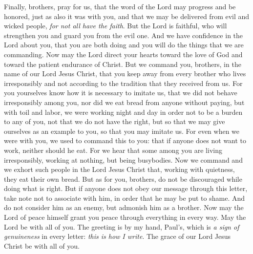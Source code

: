 \begin{biblechapter} %
 Finally, brothers, pray for us, that the word of the Lord may progress and be honored, just as also it was with you,
\verse and that we may be delivered from evil and wicked people, \textit{for not all have the faith}.
\verse But the Lord is faithful, who will strengthen you and guard you from the evil one.
\verse And we have confidence in the Lord about you, that you are both doing and you will do the things that we are commanding.
\verse Now may the Lord direct your hearts toward the love of God and toward the patient endurance of Christ.
 But we command you, brothers, in the name of our Lord Jesus Christ, that you keep away from every brother who lives irresponsibly and not according to the tradition that they received from us.
\verse For you yourselves know how it is necessary to imitate us, that we did not behave irresponsibly among you,
\verse nor did we eat bread from anyone without paying, but with toil and labor, we were working night and day in order not to be a burden to any of you,
\verse not that we do not have the right, but so that we may give ourselves as an example to you, so that you may imitate us.
\verse For even when we were with you, we used to command this to you: that if anyone does not want to work, neither should he eat.
\verse For we hear that some among you are living irresponsibly, working at nothing, but being busybodies.
\verse Now we command and we exhort such people in the Lord Jesus Christ that, working with quietness, they eat their own bread.
\verse But as for you, brothers, do not be discouraged while doing what is right.
\verse But if anyone does not obey our message through this letter, take note not to associate with him, in order that he may be put to shame.
\verse And do not consider him as an enemy, but admonish him as a brother.
 Now may the Lord of peace himself grant you peace through everything in every way. May the Lord be with all of you.
\verse The greeting is by my hand, Paul’s, which is \textit{a sign of genuineness} in every letter: \textit{this is how I write}.
\verse The grace of our Lord Jesus Christ be with all of you.
\end{biblechapter}

